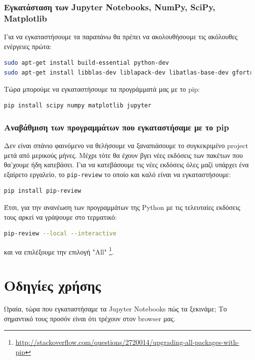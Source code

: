 \documentclass[a4paper,12pt,twoside]{report}
\theoremstyle{plain}
\theoremstyle{definition}
\theoremstyle{remark}
\begin{document}
\subsubsection{Εγκατάσταση των Jupyter Notebooks, NumPy, SciPy, Matplotlib}

Για να εγκαταστήσουμε τα παραπάνω θα πρέπει να ακολουθήσουμε τις ακόλουθες ενέργειες πρώτα:
\begin{lstlisting}[extendedchars=true,language=bash]
sudo apt-get install build-essential python-dev
sudo apt-get install libblas-dev liblapack-dev libatlas-base-dev gfortran
\end{lstlisting}

Τώρα μπορούμε να εγκαταστήσουμε τα προγράμματά μας με το pip:
\begin{lstlisting}[extendedchars=true,language=bash]
pip install scipy numpy matplotlib jupyter
\end{lstlisting}

\subsubsection{Αναβάθμιση των προγραμμάτων που εγκαταστήσαμε με το pip}

Δεν είναι σπάνιο φαινόμενο να θελήσουμε να ξαναπιάσουμε το συγκεκριμένο project μετά από μερικούς μήνες. Μέχρι τότε θα έχουν βγει νέες εκδόσεις των πακέτων που θα'χουμε ήδη κατεβάσει. Για να κατεβάσουμε τις νέες εκδόσεις όλες μαζί υπάρχει ένα εξαίρετο εργαλείο, το \texttt{pip-review} το οποίο και καλό είναι να εγκαταστήσουμε:
\begin{lstlisting}[extendedchars=true,language=bash]
pip install pip-review
\end{lstlisting}

Έτσι, για την ανανέωση των προγραμμάτων της Python με τις τελευταίες εκδόσεις τους αρκεί να γράψουμε στο τερματικό:
\begin{lstlisting}[extendedchars=true,language=BASH]
pip-review --local --interactive
\end{lstlisting}

και να επιλέξουμε την επιλογή "All" \footnote{\url{http://stackoverflow.com/questions/2720014/upgrading-all-packages-with-pip}}.

\section{Οδηγίες χρήσης}

Ωραία, τώρα που εγκαταστήσαμε τα Jupyter Notebooks πώς τα ξεκινάμε; Το σημαντικό τους προσόν είναι ότι τρέχουν στον browser μας. 
\end{document}
